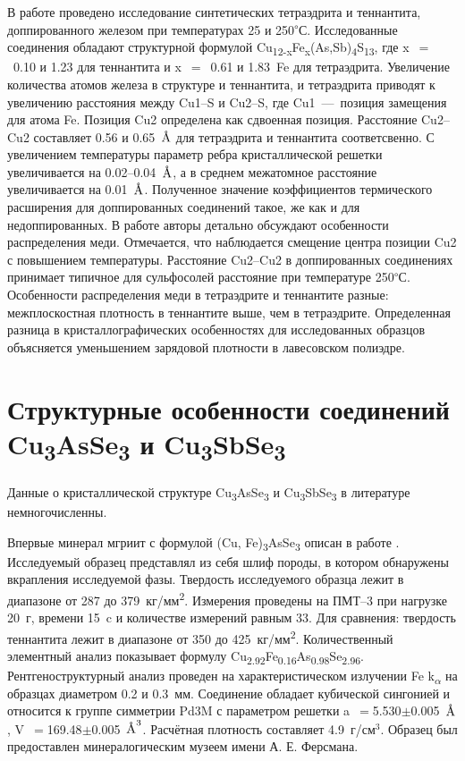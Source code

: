 В работе \cite{Friese2008} проведено исследование синтетических тетраэдрита и теннантита, доппированного железом при температурах 25 и 250\textsuperscript{$\circ$}С. Исследованные соединения обладают структурной формулой Cu\textsubscript{12-x}Fe\textsubscript{x}(As,Sb)\textsubscript{4}S\textsubscript{13}, где  x~$=$~0.10 и 1.23 для теннантита  и  x~$=$~0.61 и 1.83~Fe для тетраэдрита.
 Увеличение количества атомов железа в структуре и теннантита, и тетраэдрита приводят к увеличению расстояния между Cu1--S и Cu2--S, где Cu1~---~позиция замещения для атома Fe. Позиция Cu2 определена как сдвоенная позиция. Расстояние Cu2--Cu2 составляет 0.56 и 0.65~$\mbox{\normalfont\AA}$ для тетраэдрита и теннантита соответсвенно. С увеличением температуры параметр ребра кристаллической решетки увеличивается на 0.02--0.04~$\mbox{\normalfont\AA}$, а в среднем межатомное расстояние увеличивается на 0.01~$\mbox{\normalfont\AA}$. Полученное значение коэффициентов термического расширения для доппированных соединений такое, же как и для недоппированных.
 В работе авторы детально обсуждают особенности распределения меди. Отмечается, что наблюдается смещение центра позиции Cu2 с повышением температуры. Расстояние Cu2--Cu2 в доппированных соединениях принимает типичное для сульфосолей расстояние при температуре 250\textsuperscript{$\circ$}С. Особенности распределения меди в тетраэдрите и теннантите разные:
межплоскостная плотность в теннантите выше, чем в тетраэдрите. Определенная разница в кристаллографических особенностях для исследованных образцов объясняется уменьшением зарядовой плотности в лавесовском полиэдре.
\newpage

\section{Структурные особенности соединений Cu\textsubscript{3}AsSe\textsubscript{3} и Cu\textsubscript{3}SbSe\textsubscript{3}} \label{sect1_2}

Данные о кристаллической структуре Cu\textsubscript{3}AsSe\textsubscript{3} и Cu\textsubscript{3}SbSe\textsubscript{3} в литературе немногочисленны.

Впервые минерал мгриит с формулой (Cu, Fe)\textsubscript{3}AsSe\textsubscript{3} описан в работе \cite{Dymlcov_1983}. Исследуемый образец представлял из себя шлиф породы, в котором обнаружены вкрапления исследуемой фазы. Твердость исследуемого образца лежит в диапазоне от 287 до 379~кг/мм\textsuperscript{2}. Измерения проведены на ПМТ--3 при нагрузке 20~г, времени 15~c и количестве измерений равным 33. Для сравнения: твердость теннантита лежит в диапазоне от 350 до 425~кг/мм\textsuperscript{2}. Количественный элементный анализ показывает формулу Cu\textsubscript{2.92}Fe\textsubscript{0.16}As\textsubscript{0.98}Se\textsubscript{2.96}. Рентгеноструктурный анализ проведен на характеристическом излучении Fe k\textsubscript{$\alpha$} на образцах диаметром 0.2 и 0.3~мм. Соединение обладает кубической сингонией и относится к группе симметрии Pd3M с параметром решетки a~$=$5.530$\pm$0.005~$\mbox{\normalfont\AA}$, V~$=$169.48$\pm$0.005~$\mbox{\normalfont\AA}^{3}$. Расчётная плотность составляет 4.9~г/см$^{3}$. Образец был предоставлен минералогическим музеем имени А. Е. Ферсмана.

